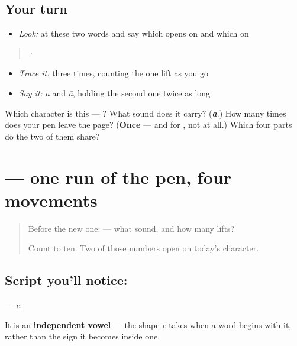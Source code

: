 \subsection*{Your turn}
\begin{itemize}
\raggedright
  \item \emph{Look:} at these two words and say which opens on  and which on 
\end{itemize}

\begin{quote}
  ·  
\end{quote}

\begin{itemize}
\raggedright
  \item \emph{Trace it:}  three times, counting the one lift as you go
  \item \emph{Say it:} \emph{a} and \emph{ā}, holding the second one twice as long
\end{itemize}

\begin{tcolorbox}[breakable,colback=teal!4,colframe=teal!35!black,title={Before you move on}]
Which character is this — ? What sound does it carry? (\emph{\textbf{ā}}.) How many times does your pen leave the page? (\textbf{Once} — and for , not at all.) Which four parts do the two of them share?
\end{tcolorbox}
\section[\texorpdfstring{\kn{ಎ} (e)}{ಎ (e)}]{ — one run of the pen, four movements}

\label{lesson:KA-S156-letter-e}



\begin{quote}
Before the new one:  — what sound, and how many lifts?

Count to ten. Two of those numbers open on today's character.
\end{quote}

\subsection*{Script you'll notice: }
\textbf{} — \emph{e}.

It is an \textbf{independent vowel} — the shape \emph{e} takes when a word begins with it, rather than the sign it becomes inside one.

